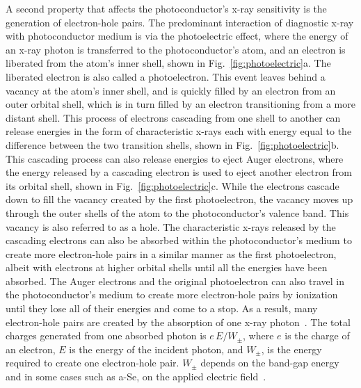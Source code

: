 A second property that affects the photoconductor's x-ray sensitivity is the generation of electron-hole pairs.  The predominant interaction of diagnostic x-ray with photoconductor medium is via the photoelectric effect, where the energy of an x-ray photon is transferred to the photoconductor's atom, and an electron is liberated from the atom's inner shell, shown in Fig.~\ref{fig:photoelectric}a.  The liberated electron is also called a photoelectron.  This event leaves behind a vacancy at the atom's inner shell, and is quickly filled by an electron from an outer orbital shell, which is in turn filled by an electron transitioning from a more distant shell.  This process of electrons cascading from one shell to another can release energies in the form of characteristic x-rays each with energy equal to the difference between the two transition shells, shown in Fig.~\ref{fig:photoelectric}b.  This cascading process can also release energies to eject Auger electrons, where the energy released by a cascading electron is used to eject another electron from its orbital shell, shown in Fig.~\ref{fig:photoelectric}c.  While the electrons cascade down to fill the vacancy created by the first photoelectron, the vacancy moves up through the outer shells of the atom to the photoconductor's valence band.  This vacancy is also referred to as a hole.  The characteristic x-rays released by the cascading electrons can also be absorbed within the photoconductor's medium to create more electron-hole pairs in a similar manner as the first photoelectron, albeit with electrons at higher orbital shells until all the energies have been absorbed.  The Auger electrons and the original photoelectron can also travel in the photoconductor's medium to create more electron-hole pairs by ionization until they lose all of their energies and come to a stop.  As a result, many electron-hole pairs are created by the absorption of one x-ray photon~\citep{Bushberg2002, Hajdok2006}.  The total charges generated from one absorbed photon is $e \, E / W_{\pm}$, where $e$ is the charge of an electron, $E$ is the energy of the incident photon, and $W_{\pm}$, is the energy required to create one electron-hole pair.  $W_{\pm}$ depends on the band-gap energy and in some cases such as a-Se, on the applied electric field~\citep{kasap2006}.
    

